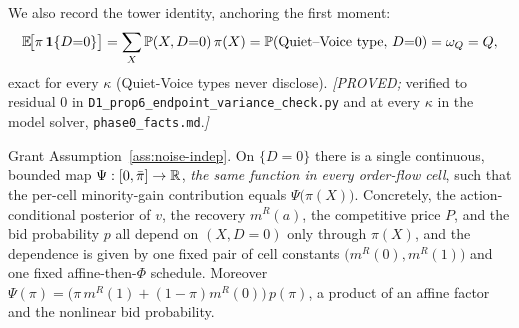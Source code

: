 We also record the tower identity, anchoring the first moment:
\begin{equation}\label{eq:tower}
   \mathbb{E}\!\bigl[\pi\,\mathbf{1}\{D{=}0\}\bigr]
   =\sum_{X}\mathbb{P}(X,D{=}0)\,\pi(X)
   =\mathbb{P}(\text{Quiet--Voice type},\,D{=}0)
   =\omega_Q=Q,
\end{equation}
exact for every $\kappa$ (Quiet-Voice types never disclose).
\emph{[PROVED;} verified to residual $0$ in
\texttt{D1\_prop6\_endpoint\_variance\_check.py} and at every $\kappa$ in the
model solver, \texttt{phase0\_facts.md}.\emph{]}

\begin{lemma}\label{lem:transport}
Grant Assumption~\ref{ass:noise-indep}. On $\{D=0\}$ there is a single
continuous, bounded map $\Psi:[0,\bar\pi]\to\mathbb{R}$, \emph{the same function in
every order-flow cell}, such that the per-cell minority-gain contribution equals
$\Psi\bigl(\pi(X)\bigr)$. Concretely, the action-conditional posterior of $v$,
the recovery $m^{R}(a)$, the competitive price $P$, and the bid probability $p$
all depend on $(X,D{=}0)$ only through $\pi(X)$, and the dependence is given by
one fixed pair of cell constants $\bigl(m^{R}(0),m^{R}(1)\bigr)$ and one fixed
affine-then-$\Phi$ schedule. Moreover
$\Psi(\pi)=\bigl(\pi\,m^{R}(1)+(1-\pi)m^{R}(0)\bigr)\,p(\pi)$, a product of an
affine factor and the nonlinear bid probability.
\end{lemma}

